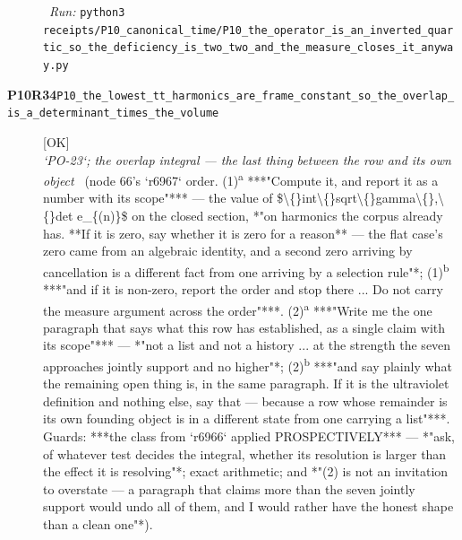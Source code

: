 \begin{description}
\ \emph{Run:} \texttt{python3 receipts/P10\_canonical\_time/P10\_the\_operator\_is\_an\_inverted\_quartic\_so\_the\_deficiency\_is\_two\_two\_and\_the\_measure\_closes\_it\_anyway.py}
\item[\rcptlabel{P10_the_lowest_tt_harmonics_are_frame_constant_so_the_overlap_is_a_determinant_times_the_volume}{P10R34}\textbf{P10R34}\quad\texttt{P10\_the\_lowest\_tt\_harmonics\_are\_frame\_constant\_so\_the\_overlap\_is\_a\_determinant\_times\_the\_volume}]\hfill\textsf{[OK]}\\
\textit{`PO-23`; the overlap integral --- the last thing between the row and its own object} \ (node 66's `r6967` order. (1)\textsuperscript{a} ***"Compute it, and report it as a number with its scope"*** --- the value of \$\textbackslash\{\}int\textbackslash\{\}sqrt\textbackslash\{\}gamma\textbackslash\{\},\textbackslash\{\}det e\_\{(n)\}\$ on the closed section, *"on harmonics the corpus already has. **If it is zero, say whether it is zero for a reason** --- the flat case's zero came from an algebraic identity, and a second zero arriving by cancellation is a different fact from one arriving by a selection rule"*; (1)\textsuperscript{b} ***"and if it is non-zero, report the order and stop there ... Do not carry the measure argument across the order"***. (2)\textsuperscript{a} ***"Write me the one paragraph that says what this row has established, as a single claim with its scope"*** --- *"not a list and not a history ... at the strength the seven approaches jointly support and no higher"*; (2)\textsuperscript{b} ***"and say plainly what the remaining open thing is, in the same paragraph. If it is the ultraviolet definition and nothing else, say that --- because a row whose remainder is its own founding object is in a different state from one carrying a list"***.  Guards: ***the class from `r6966` applied PROSPECTIVELY*** --- *"ask, of whatever test decides the integral, whether its resolution is larger than the effect it is resolving"*; exact arithmetic; and *"(2) is not an invitation to overstate --- a paragraph that claims more than the seven jointly support would undo all of them, and I would rather have the honest shape than a clean one"*). 

\end{description}
